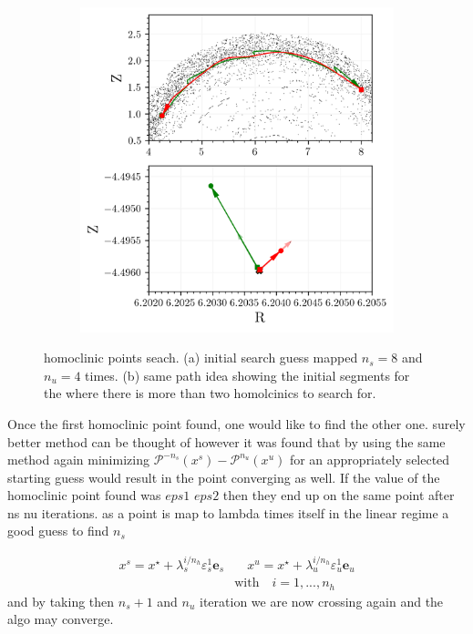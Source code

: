 \begin{figure}[h!]
\begin{subfigure}[t]{0.49\textwidth}
        \includegraphics[width=\textwidth]{images/clinicsearch/search_domain.png}
        \caption{}
        \label{fig:clinic-search-b}
    \end{subfigure}
    \caption{homoclinic points seach. (a) initial search guess mapped $n_s = 8$ and $n_u = 4$ times. (b) same path idea showing the initial segments for the where there is more than two homolcinics to search for.}
    \label{fig:clinic-search}
\end{figure}

Once the first homoclinic point found, one would like to find the other one. surely better method can be thought of however it was found that by using the same method again minimizing $\mathcal{P}^{-n_s}(x^s) - \mathcal{P}^{n_u}(x^u)$ for an appropriately  selected starting guess would result in the point converging as well. If the value of the homoclinic point found was $eps1$ $eps2$ then they end up on the same point after ns nu iterations. as a point is map to lambda times itself in the linear regime a good guess to find $n_s$

\begin{align*}
       x^s = x^\star+\lambda_s^{i/n_h}\varepsilon_s^1 \textbf{e}_s &\quad
x^u = x^\star+\lambda_u^{i/n_h}\varepsilon_u^1 \textbf{e}_u\\
&\text{with}\quad i = 1,...,n_h
\end{align*}
and by taking then $n_s+1$ and $n_u$ iteration we are now crossing again and the algo may converge.


